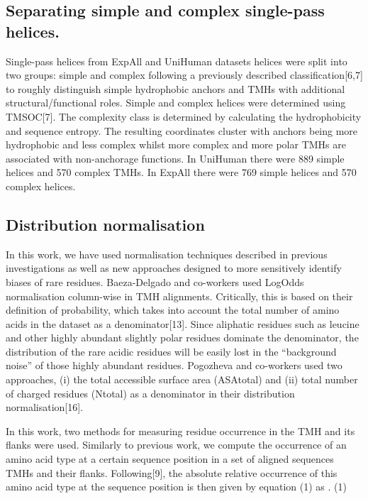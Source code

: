 \subsection{Separating simple and complex single-pass helices.}

Single-pass helices from ExpAll and UniHuman datasets helices were split into two groups: simple and complex following a previously described classification[6,7] to roughly distinguish simple hydrophobic anchors and TMHs with additional structural/functional roles. Simple and complex helices were determined using TMSOC[7]. The complexity class is determined by calculating the hydrophobicity and sequence entropy. The resulting coordinates cluster with anchors being more hydrophobic and less complex whilst more complex and more polar TMHs are associated with non-anchorage functions. In UniHuman there were 889 simple helices and 570 complex TMHs. In ExpAll there were 769 simple helices and 570 complex helices.

\subsection{Distribution normalisation}

In this work, we have used normalisation techniques described in previous investigations as well as new approaches designed to more sensitively identify biases of rare residues. Baeza-Delgado and co-workers used LogOdds normalisation column-wise in TMH alignments. Critically, this is based on their definition of probability, which takes into account the total number of amino acids in the dataset as a denominator[13]. Since aliphatic residues such as leucine and other highly abundant slightly polar residues dominate the denominator, the distribution of the rare acidic residues will be easily lost in the “background noise” of those highly abundant residues. Pogozheva and co-workers used two approaches, (i) the total accessible surface area (ASAtotal) and (ii) total number of charged residues (Ntotal) as a denominator in their distribution normalisation[16].

In this work, two methods for measuring residue occurrence in the TMH and its flanks were used. Similarly to previous work, we compute the occurrence  of an amino acid type  at a certain sequence position  in a set of aligned sequences TMHs and their flanks. Following[9], the absolute relative occurrence  of this amino acid type at the sequence position  is then given by equation (1) as
.	(1)

